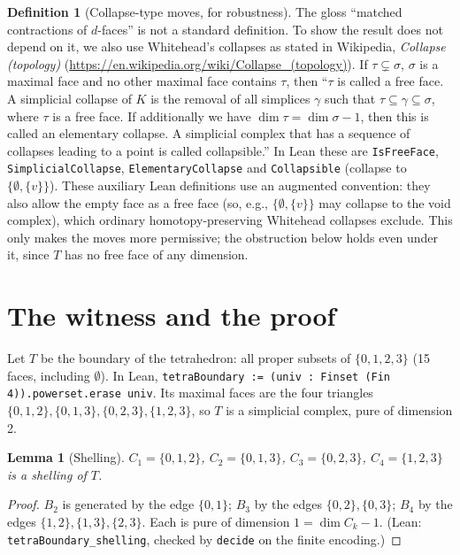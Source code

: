 \documentclass[11pt]{article}
\newtheorem{lemma}[theorem]{Lemma}
\theoremstyle{definition}
\newtheorem{definition}[theorem]{Definition}
\begin{document}
\begin{definition}[Collapse-type moves, for robustness]
The gloss ``matched contractions of $d$-faces'' is not a standard definition. To show the result
does not depend on it, we also use Whitehead's collapses as stated in Wikipedia, \emph{Collapse
(topology)} (\url{https://en.wikipedia.org/wiki/Collapse_(topology)}). If $\tau\subsetneq\sigma$,
$\sigma$ is a maximal face and no other maximal face contains $\tau$, then ``$\tau$ is called a free
face. A simplicial collapse of $K$ is the removal of all simplices $\gamma$ such that
$\tau\subseteq\gamma\subseteq\sigma$, where $\tau$ is a free face. If additionally we have
$\dim\tau=\dim\sigma-1$, then this is called an elementary collapse. A simplicial complex that has a
sequence of collapses leading to a point is called collapsible.'' In Lean these are
\texttt{IsFreeFace}, \texttt{SimplicialCollapse}, \texttt{ElementaryCollapse} and
\texttt{Collapsible} (collapse to $\{\emptyset,\{v\}\}$). These auxiliary Lean definitions use an
augmented convention: they also allow the empty face as a free face (so, e.g., $\{\emptyset,\{v\}\}$
may collapse to the void complex), which ordinary homotopy-preserving Whitehead collapses exclude.
This only makes the moves more permissive; the obstruction below holds even under it, since $T$ has
no free face of any dimension.
\end{definition}

\section{The witness and the proof}

Let $T$ be the boundary of the tetrahedron: all proper subsets of $\{0,1,2,3\}$ (15 faces, including
$\emptyset$). In Lean, \texttt{tetraBoundary := (univ : Finset (Fin 4)).powerset.erase univ}.
Its maximal faces are the four triangles $\{0,1,2\},\{0,1,3\},\{0,2,3\},\{1,2,3\}$, so $T$ is a
simplicial complex, pure of dimension 2.

\begin{lemma}[Shelling]
$C_1=\{0,1,2\}$, $C_2=\{0,1,3\}$, $C_3=\{0,2,3\}$, $C_4=\{1,2,3\}$ is a shelling of $T$.
\end{lemma}
\begin{proof}
$B_2$ is generated by the edge $\{0,1\}$; $B_3$ by the edges $\{0,2\},\{0,3\}$; $B_4$ by the edges
$\{1,2\},\{1,3\},\{2,3\}$. Each is pure of dimension $1=\dim C_k-1$. (Lean:
\texttt{tetraBoundary\_shelling}, checked by \texttt{decide} on the finite encoding.)
\end{proof}
\end{document}
